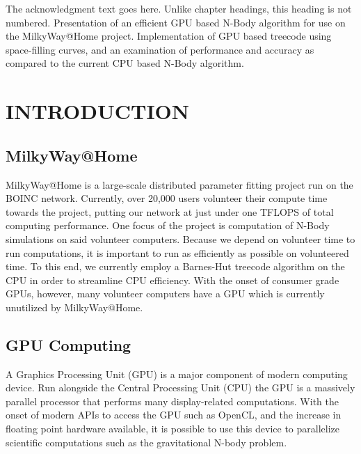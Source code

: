 \documentclass{thesis}
\author{Clayton Rayment}
\begin{document}
 
\titlepage             %
\tableofcontents       %
\listoftables          %
\listoffigures         %

The acknowledgment text goes here. Unlike chapter headings, 
this heading is not numbered.
Presentation of an efficient GPU based N-Body algorithm for use on the MilkyWay@Home project. Implementation of GPU based treecode using space-filling curves, and an examination of performance and accuracy as compared to the current CPU based N-Body algorithm.
\chapter{INTRODUCTION}
\section{MilkyWay@Home}
MilkyWay@Home is a large-scale distributed parameter fitting project run on the BOINC network. Currently, over 20,000 users volunteer their compute time towards the project, putting our network at just under one TFLOPS of total computing performance.  One focus of the project is computation of N-Body simulations on said volunteer computers. Because we depend on volunteer time to run computations, it is important to run as efficiently as possible on volunteered time. To this end, we currently employ a Barnes-Hut treecode algorithm on the CPU in order to streamline CPU efficiency. With the onset of consumer grade GPUs, however, many volunteer computers have a GPU which is currently unutilized by MilkyWay@Home.
\section{GPU Computing}
A Graphics Processing Unit (GPU) is a major component of modern computing device. Run alongside the Central Processing Unit (CPU) the GPU is a massively parallel processor that performs many display-related computations. With the onset of modern APIs to access the GPU such as OpenCL, and the increase in floating point hardware available, it is possible to use this device to parallelize scientific computations such as the gravitational N-body problem.
\end{document}
